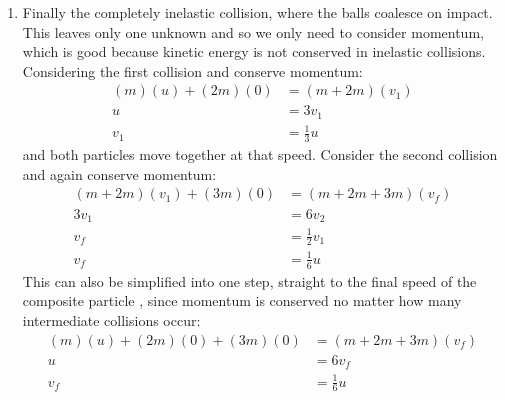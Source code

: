 \begin{problem}[A1969AMIIQ8l]
{\begin{enumerate}
As before, repeating the process for the second collision gives two equations:
\begin{align*} 
2v_{2} &= 2w_{2} + 3w_{3} \\
 2v_{2}^{2} &= 2w_{2}^{2} + 3w_{3}^{2} 
 \end{align*}
with solution for after the collision of  =  and  = . Thus the final speeds after the second collision are:
\begin{align*} 
v_{1} = - \frac{1}{3}u && w_{2} = - \frac{2}{15}u && w_{3} = \frac{8}{15}u 
\end{align*}
	\item Finally the completely inelastic collision, where the balls coalesce on impact. This leaves only one unknown and so we only need to consider momentum, which is good because kinetic energy is not conserved in inelastic collisions.
Considering the first collision and conserve momentum:
\begin{align*} 
(m)(u) + (2m)(0) &= (m + 2m)(v_{1}) \\
 u &= 3v_{1} \\ 
 v_{1} &= \frac{1}{3}u 
 \end{align*} 
 and both particles move together at that speed.
Consider the second collision and again conserve momentum:
\begin{align*} 
(m + 2m)(v_{1}) + (3m)(0) &= (m + 2m + 3m)(v_{f}) \\ 
3v_{1} &= 6v_{2} \\ 
v_{f} &= \frac{1}{2} v_{1} \\ 
v_{f} &= \frac{1}{6} u 
\end{align*}
This can also be simplified into one step, straight to the final speed of the composite particle , since momentum is conserved no matter how many intermediate collisions occur:
\begin{align*} 
(m)(u) + (2m)(0) + (3m)(0) &= (m + 2m + 3m)(v_{f}) \\ 
u &= 6 v_{f} \\ 
v_{f} &= \frac{1}{6} u 
\end{align*}
\end{enumerate}

}
\end{problem}